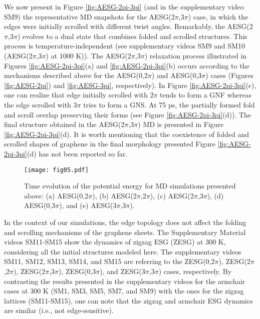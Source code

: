 \documentclass[twoside,twocolumn,9pt]{article}
\begin{document}
We now present in Figure \ref{fig:AESG-2pi-3pi} (and in the supplementary video SM9) the representative MD snapshots for the AESG(2$\pi$,3$\pi$) case, in which the edges were initially scrolled with different twist angles. Remarkably, the AESG(2$\pi$,3$\pi$) evolves to a dual state that combines folded and scrolled structures. This process is temperature-independent (see supplementary videos SM9 and SM10 (AESG(2$\pi$,3$\pi$) at 1000 K)). The AESG(2$\pi$,3$\pi$) relaxation process illustrated in Figures \ref{fig:AESG-2pi-3pi}(a) and \ref{fig:AESG-2pi-3pi}(b) occurs according to the mechanisms described above for the AESG(0,2$\pi$) and AESG(0,3$\pi$) cases (Figures \ref{fig:AESG-2pi}) and \ref{fig:AESG-3pi}, respectively). In Figure \ref{fig:AESG-2pi-3pi}(c), one can realize that edge initially scrolled with $2\pi$ tends to form a GNF whereas the edge scrolled with $3\pi$ tries to form a GNS. At 75 ps, the partially formed fold and scroll overlap preserving their forms (see Figure \ref{fig:AESG-2pi-3pi}(d)). The final structure obtained in the AESG(2$\pi$,3$\pi$) MD is presented in Figure \ref{fig:AESG-2pi-3pi}(d). It is worth mentioning that the coexistence of folded and scrolled shapes of graphene in the final morphology presented Figure \ref{fig:AESG-2pi-3pi}(d) has not been reported so far.         

\begin{figure}[htb!]
	\centering
	\texttt{[image: fig05.pdf]}
	\caption{Time evolution of the potential energy for MD simulations presented above: (a) AESG(0,2$\pi$), (b) AESG(2$\pi$,2$\pi$), (c) AESG(2$\pi$,3$\pi$), (d) AESG(0,3$\pi$), and (e) AESG(3$\pi$,3$\pi$).}
	\label{fig:energies}
\end{figure}

In the context of our simulations, the edge topology does not affect the folding and scrolling mechanisms of the graphene sheets. The Supplementary Material videos SM11-SM15 show the dynamics of zigzag ESG (ZESG) at 300 K, considering all the initial structures modeled here. The supplementary videos SM11, SM12, SM13, SM14, and SM15 are referring to the ZESG(0,2$\pi$), ZESG(2$\pi$,2$\pi$), ZESG(2$\pi$,3$\pi$), ZESG(0,3$\pi$), and ZESG(3$\pi$,3$\pi$) cases, respectively. By contrasting the results presented in the supplementary videos for the armchair cases at 300 K (SM1, SM3, SM5, SM7, and SM9) with the ones for the zigzag lattices (SM11-SM15), one can note that the zigzag and armchair ESG dynamics are similar (i.e., not edge-sensitive).
\end{document}
